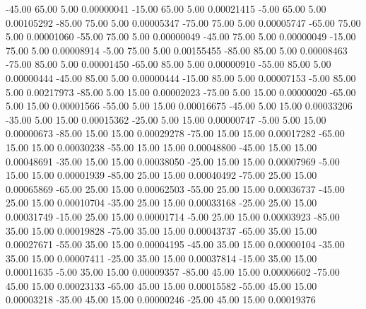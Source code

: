     -45.00     65.00      5.00     0.00000041
    -15.00     65.00      5.00     0.00021415
     -5.00     65.00      5.00     0.00105292
    -85.00     75.00      5.00     0.00005347
    -75.00     75.00      5.00     0.00005747
    -65.00     75.00      5.00     0.00001060
    -55.00     75.00      5.00     0.00000049
    -45.00     75.00      5.00     0.00000049
    -15.00     75.00      5.00     0.00008914
     -5.00     75.00      5.00     0.00155455
    -85.00     85.00      5.00     0.00008463
    -75.00     85.00      5.00     0.00001450
    -65.00     85.00      5.00     0.00000910
    -55.00     85.00      5.00     0.00000444
    -45.00     85.00      5.00     0.00000444
    -15.00     85.00      5.00     0.00007153
     -5.00     85.00      5.00     0.00217973
    -85.00      5.00     15.00     0.00002023
    -75.00      5.00     15.00     0.00000020
    -65.00      5.00     15.00     0.00001566
    -55.00      5.00     15.00     0.00016675
    -45.00      5.00     15.00     0.00033206
    -35.00      5.00     15.00     0.00015362
    -25.00      5.00     15.00     0.00000747
     -5.00      5.00     15.00     0.00000673
    -85.00     15.00     15.00     0.00029278
    -75.00     15.00     15.00     0.00017282
    -65.00     15.00     15.00     0.00030238
    -55.00     15.00     15.00     0.00048800
    -45.00     15.00     15.00     0.00048691
    -35.00     15.00     15.00     0.00038050
    -25.00     15.00     15.00     0.00007969
     -5.00     15.00     15.00     0.00001939
    -85.00     25.00     15.00     0.00040492
    -75.00     25.00     15.00     0.00065869
    -65.00     25.00     15.00     0.00062503
    -55.00     25.00     15.00     0.00036737
    -45.00     25.00     15.00     0.00010704
    -35.00     25.00     15.00     0.00033168
    -25.00     25.00     15.00     0.00031749
    -15.00     25.00     15.00     0.00001714
     -5.00     25.00     15.00     0.00003923
    -85.00     35.00     15.00     0.00019828
    -75.00     35.00     15.00     0.00043737
    -65.00     35.00     15.00     0.00027671
    -55.00     35.00     15.00     0.00004195
    -45.00     35.00     15.00     0.00000104
    -35.00     35.00     15.00     0.00007411
    -25.00     35.00     15.00     0.00037814
    -15.00     35.00     15.00     0.00011635
     -5.00     35.00     15.00     0.00009357
    -85.00     45.00     15.00     0.00006602
    -75.00     45.00     15.00     0.00023133
    -65.00     45.00     15.00     0.00015582
    -55.00     45.00     15.00     0.00003218
    -35.00     45.00     15.00     0.00000246
    -25.00     45.00     15.00     0.00019376
